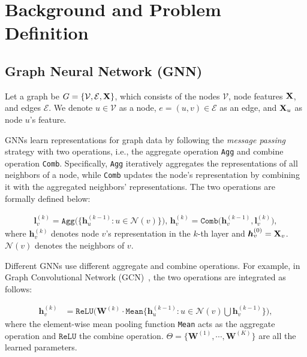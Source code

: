 \section{Background and Problem Definition}
\label{sec:background}

 \subsection{\bf Graph Neural Network (GNN)} 

Let a graph be $G=\{\mathcal{V},\mathcal{E},{\bf X}\}$, which consists of the nodes $\mathcal{V}$, node features  ${\bf X}$, and edges $\mathcal{E}$. We denote $u\in \mathcal{V}$ as a node, $e=(u,v) \in \mathcal{E}$ as an edge, and ${\bf X}_u$ as node $u$'s feature. 

GNNs learn representations for graph data 
by following the \textit{message passing} strategy with two operations, i.e.,  the {aggregate} operation \texttt{Agg} and {combine} operation \texttt{Comb}.
Specifically, \texttt{Agg} iteratively aggregates the representations of all neighbors of a node, while \texttt{Comb} updates the node’s representation by combining it with the aggregated neighbors’ representations. The two operations are formally defined below:

{
\vspace{-4mm}
\small
\begin{align}
\label{aggregate}
\bm{l}_v^{(k)} =  \texttt{Agg} \big(\big\{ \bm{h}_u^{(k-1)}: u \in \mathcal{N}(v) \big\} \big), \, \bm{h}_v^{(k)} = \texttt{Comb}\big(\bm{h}_v^{(k-1)},  \bm{l}_v^{(k)} \big),
\end{align}
}%
where $\bm{h}_v^{(k)}$ denotes node $v$'s representation in the $k$-th layer and $\bm{h}_v^{(0)}={\bf X}_v$. $\mathcal{N}(v)$ denotes the neighbors of $v$. 

Different GNNs use different aggregate and combine operations. For example, in Graph Convolutional Network (GCN)~\cite{kipf2017semi}, the two operations are integrated as follows:

{
\vspace{-4mm}
\small
 \begin{align}
 \label{aggregate_gcn}
 \bm{h}_v^{(k)} & = \texttt{ReLU}\big( \bm{W}^{(k)} \cdot \texttt{Mean}  \big \{  \bm{h}_{u}^{(k-1)}: u \in \mathcal{N}(v) \bigcup \bm{h}_v^{(k-1)} \big \} \big), %
 \end{align}
 }%
where the element-wise mean pooling function \texttt{Mean} acts as the aggregate operation and $\texttt{ReLU}$ the combine operation. $\Theta = \{\bm{W}^{(1)}, \cdots, \bm{W}^{(K)} \} $ are all the learned parameters. 




